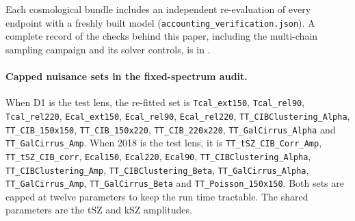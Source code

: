 Each cosmological bundle includes an independent re-evaluation of every endpoint with a freshly built model (\texttt{accounting\_\allowbreak{}verification.json}). A complete record of the checks behind this paper, including the multi-chain sampling campaign and its solver controls, is in .

\paragraph{Capped nuisance sets in the fixed-spectrum audit.}
When D1 is the test lens, the re-fitted set is \texttt{Tcal\_\allowbreak{}ext150}, \texttt{Tcal\_\allowbreak{}rel90}, \texttt{Tcal\_\allowbreak{}rel220}, \texttt{Ecal\_\allowbreak{}ext150}, \texttt{Ecal\_\allowbreak{}rel90}, \texttt{Ecal\_\allowbreak{}rel220}, \texttt{TT\_\allowbreak{}CIBClustering\_Alpha}, \texttt{TT\_\allowbreak{}CIB\_150x150}, \texttt{TT\_\allowbreak{}CIB\_150x220}, \texttt{TT\_\allowbreak{}CIB\_220x220}, \texttt{TT\_\allowbreak{}GalCirrus\_Alpha} and \texttt{TT\_\allowbreak{}GalCirrus\_Amp}. When 2018 is the test lens, it is \texttt{TT\_\allowbreak{}tSZ\_CIB\_Corr\_Amp}, \texttt{TT\_\allowbreak{}tSZ\_CIB\_corr}, \texttt{Ecal150}, \texttt{Ecal220}, \texttt{Ecal90}, \texttt{TT\_\allowbreak{}CIBClustering\_Alpha}, \texttt{TT\_\allowbreak{}CIBClustering\_Amp}, \texttt{TT\_\allowbreak{}CIBClustering\_Beta}, \texttt{TT\_\allowbreak{}GalCirrus\_Alpha}, \texttt{TT\_\allowbreak{}GalCirrus\_Amp}, \texttt{TT\_\allowbreak{}GalCirrus\_Beta} and \texttt{TT\_\allowbreak{}Poisson\_150x150}. Both sets are capped at twelve parameters to keep the run time tractable. The shared parameters are the tSZ and kSZ amplitudes.

